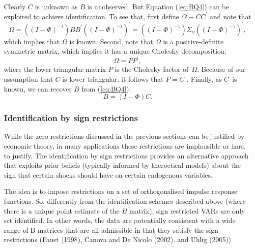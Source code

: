\documentclass[10pt]{article}
\begin{document}
Clearly $C$ is unknown as $B$ is unobserved. But Equation (\ref{eq:BQ4}) can
be exploited to achieve identification. To see that, first define $\Omega
\equiv CC^{\prime }$ and note that 
\begin{equation}
\Omega =\left( \left( I-\Phi \right) ^{-1}\right) BB^{\prime }\left( \left(
I-\Phi \right) ^{-1}\right) ^{\prime }=\left( \left( I-\Phi \right)
^{-1}\right) \Sigma _{u}\left( \left( I-\Phi \right) ^{-1}\right) ^{\prime },
\label{eq:BQ6}
\end{equation}%
which implies that $\Omega $ is known. Second, note that $\Omega $ is a
positive-definite symmetric matrix, which implies it has a unique Cholesky
decomposition:%
\begin{equation}
\Omega =PP^{\prime },  \label{eq:BQ7}
\end{equation}%
where the lower triangular matrix $P$ is the Cholesky factor of\ $\Omega $.
Because of our assumption that $C$ is lower triangular, it follows that $P=C$%
. Finally, as $C$\ is known, we can recover $B$ from (\ref{eq:BQ4}):%
\begin{equation}
B=\left( I-\Phi \right) C.  \label{eq:BQ8}
\end{equation}

\subsubsection{Identification by sign restrictions}

While the zero restrictions discussed in the previous sections can be
justified by economic theory, in many applications these restrictions are
implausible or hard to justify. The identification by sign restrictions
provides an alternative approach that exploits prior beliefs (typically
informed by theroetical models) about the sign that certain shocks should
have on certain endogenous variables.

The idea is to impose restrictions on a set of orthogonalised impulse
response functions. So, differently from the identification schemes
described above (where there is a unique point estimate of the $B$ matrix),
sign restricted VARs are only set identified. In other words, the data are
potentially consistent with a wide range of B matrices that are all
admissible in that they satisfy the sign restrictions (Faust (1998), Canova
and De Nicolo (2002), and Uhlig (2005))
\end{document}
